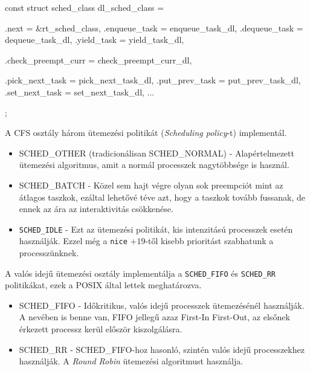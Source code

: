 \begin{cpp}
const struct sched_class dl_sched_class = {
	.next			= &rt_sched_class,
	.enqueue_task		= enqueue_task_dl,
	.dequeue_task		= dequeue_task_dl,
	.yield_task		= yield_task_dl,

	.check_preempt_curr	= check_preempt_curr_dl,

	.pick_next_task		= pick_next_task_dl,
	.put_prev_task		= put_prev_task_dl,
	.set_next_task		= set_next_task_dl,
...
};
\end{cpp}



A CFS osztály három ütemezési politikát (\textit{Scheduling policy}-t) implementál.
\begin{itemize}	
    \item SCHED\_OTHER (tradicionálisan  SCHED\_NORMAL) - Alapértelmezett ütemezési algoritmus, amit a normál processzek nagytöbbsége is használ.

    \item SCHED\_BATCH - Közel sem hajt végre olyan sok preempciót mint az átlagos taszkok, ezáltal lehetővé téve azt, hogy a taszkok tovább fussanak, de ennek az ára az interaktivitás csökkenése.
        
	  \item \texttt{SCHED\_IDLE} - Ezt az ütemezési politikát, kis intenzitású processzek esetén használják. Ezzel még a \texttt{nice} $+19$-től kisebb prioritást szabhatunk a processzünknek.
\end{itemize}
A valós idejű ütemezési osztály implementálja a \texttt{SCHED\_FIFO} és \texttt{SCHED\_RR} politikákat, ezek a POSIX által lettek meghatározva.
\begin{itemize}
	\item SCHED\_FIFO - Időkritikus, valós idejű processzek ütemezésénél használják. A nevében is benne van, FIFO jellegű azaz First-In First-Out, az elsőnek érkezett processz kerül először kiszolgálásra. 
	\item SCHED\_RR - SCHED\_FIFO-hoz hasonló, szintén valós idejű processzekhez használják. A \textit{Round Robin} ütemezési algoritmust használja.
\end{itemize}

